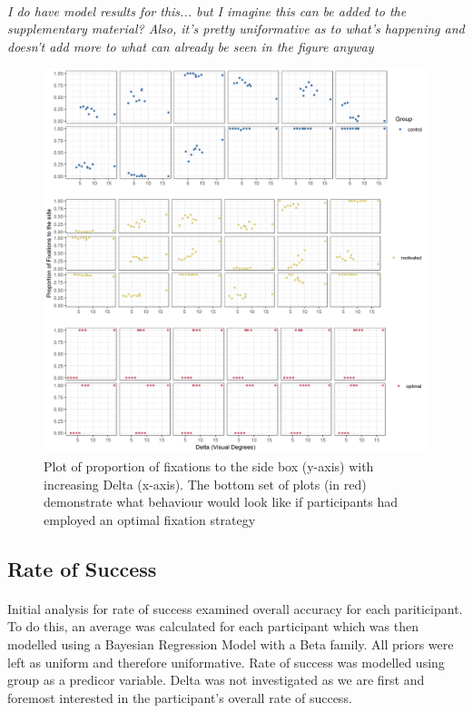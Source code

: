 \documentclass[12pt]{article}
\begin{document}
\paragraph{} \textit{I do have model results for this... but I imagine this can be added to the supplementary material? Also, it's pretty uniformative as to what's happening and doesn't add more to what can already be seen in the figure anyway}

\begin{figure}[ht!]
	\includegraphics[scale=0.7]{../Figures/Part_2_all_groups.png}
	\centering
	\captionsetup{justification=centering}
	\caption{Plot of proportion of fixations to the side box (y-axis) with increasing Delta (x-axis). The bottom set of plots (in red) demonstrate what behaviour would look like if participants had employed an optimal fixation strategy}
	\label{fig:Position_raw}
\end{figure}

\subsection*{Rate of Success} 
\paragraph{} Initial analysis for rate of success examined overall accuracy for each pariticipant. To do this, an average was calculated for each participant which was then modelled using a Bayesian Regression Model with a Beta family. All priors were left as uniform and therefore uniformative. Rate of success was modelled using group as a predicor variable. Delta was not investigated as we are first and foremost interested in the participant's overall rate of success. 
\end{document}
